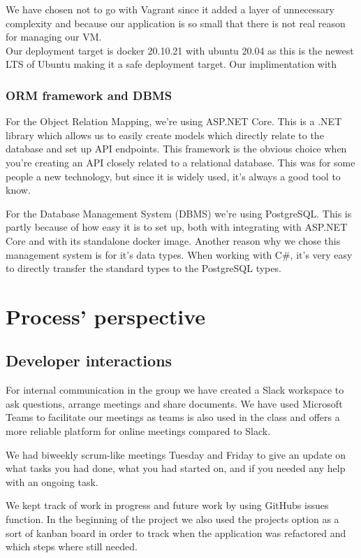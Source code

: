 \documentclass{article}
\begin{document}
We have chosen not to go with Vagrant since it added a layer of unnecessary complexity and because our application is so small that there is not real reason for managing our VM. \\

Our deployment target is docker 20.10.21 with ubuntu 20.04 as this is the newest LTS of Ubuntu making it a safe deployment target.
Our implimentation with 
\subsubsection{ORM framework and DBMS}
For the Object Relation Mapping, we're using ASP.NET Core. This is a .NET library which allows us to easily create models which directly relate to the database and set up API endpoints. This framework is the obvious choice when you're creating an API closely related to a relational database. This was for some people a new technology, but since it is widely used\cite{brainspire}, it's always a good tool to know.

For the Database Management System (DBMS) we're using PostgreSQL\cite{postgresql}. This is partly because of how easy it is to set up, both with integrating with ASP.NET Core and with its standalone docker image. Another reason why we chose this management system is for it's data types. When working with C\#, it's very easy to directly transfer the standard types to the PostgreSQL types.

\section{Process' perspective}
\subsection{Developer interactions}
\label{dev-interactions}
For internal communication in the group we have created a Slack workspace to ask questions, arrange meetings and share documents. We have used Microsoft Teams to facilitate our meetings as teams is also used in the class and offers a more reliable platform for online meetings compared to Slack. 

We had biweekly scrum-like meetings Tuesday and Friday to give an update on what tasks you had done, what you had started on, and if you needed any help with an ongoing task.

We kept track of work in progress and future work by using GitHubs issues function. In the beginning of the project we also used the projects option as a sort of kanban board in order to track when the application was refactored and which steps where still needed. 
\end{document}
